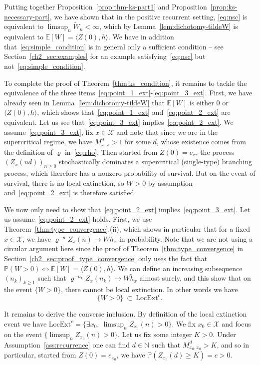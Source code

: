 \begin{refsegment}
Putting together Proposition~\ref{prop:thm-ks-part1} and Proposition~\ref{prop:ks-necessary-part}, we have shown that in the positive recurrent setting, \eqref{eq:nsc} is equivalent to $\limsup_n \widetilde{W}_n <\infty$, which by Lemma~\ref{lem:dichotomy-tildeW} is equivalent to $\mathbb{E}[W]=\langle Z(0), h \rangle$. We have in addition that~\eqref{eq:simple_condition} is in general only a sufficient condition -- see Section~\ref{ch2_sec:examples} for an example satisfying~\eqref{eq:nsc} but not~\eqref{eq:simple_condition}.

\medskip

To complete the proof of Theorem~\ref{thm:ks_condition}, it remains to tackle the equivalence of the three items~\ref{eq:point_1_ext}-\ref{eq:point_3_ext}.
First, we have already seen in Lemma~\ref{lem:dichotomy-tildeW} that $\mathbb{E}[W]$ is either $0$ or $\langle Z(0), h\rangle$, which shows that~\ref{eq:point_1_ext} and~\ref{eq:point_2_ext} are equivalent.
Let us see that~\ref{eq:point_3_ext} implies~\ref{eq:point_2_ext}. We assume~\ref{eq:point_3_ext}, fix $x\in \mathcal{X}$ and note that since we are in the supercritical regime, we have $M^d_{x,x}>1$ for some $d$, whose existence comes from the definition of $\varrho$ in~\eqref{eq:rho}.
Then started from $Z(0)=e_x$, the process $(Z_x(nd))_{n\geq 0}$ stochastically dominates a supercritical (single-type) branching process, which therefore has a nonzero probability of survival.
But on the event of survival, there is no local extinction, so $W>0$ by assumption and~\ref{eq:point_2_ext} is therefore satisfied.

We now only need to show that~\ref{eq:point_2_ext} implies~\ref{eq:point_3_ext}.
Let us assume~\ref{eq:point_2_ext} holds.
First, we use Theorem~\ref{thm:type_convergence}.(ii), which shows in particular that for a fixed $x\in \mathcal{X}$, we have $\varrho^{-n}Z_x(n)\to W\tilde{h}_x$ in probability.
Note that we are not using a circular argument here since the proof of Theorem~\ref{thm:type_convergence} in Section~\ref{ch2_sec:proof_type_convergence} only uses the fact that $\mathbb{P}(W>0) \iff \mathbb{E}[W]=\langle Z(0), h\rangle$.
We can define an increasing subsequence $(n_k)_{k\geq 1}$ such that $\varrho^{-n_k}Z_x(n_k)\to W\tilde{h}_x$ almost surely, and this show that on the event $\{W>0\}$, there cannot be local extinction.
In other words we have
\[
  \{W>0\}\ \subset\ \mathrm{LocExt}^c.
\]


It remains to derive the converse inclusion.
By definition of the local extinction event we have $\mathrm{LocExt}^c = \{\exists x_0,\ \limsup_{n}Z_{x_0}(n)>0\}$. We fix $x_0\in \mathcal{X}$ and focus on the event $\{\limsup_{n}Z_{x_0}(n)>0\}$.
Let us fix some integer $K>0$.
Under Assumption~\ref{ass:recurrence} one can find $d\in \mathbb{N}$ such that $M^d_{x_0,x_0}>K$, and so in particular, started from $Z(0)=e_{x_0}$, we have $\mathbb{P}(Z_{x_0}(d)\geq K)=c>0$.



\end{refsegment}

